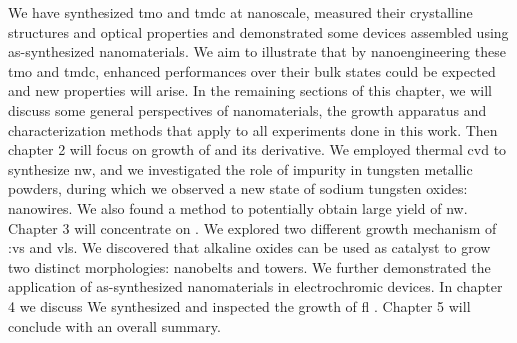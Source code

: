 We have synthesized \gls{tmo} and \gls{tmdc} at nanoscale, measured their crystalline structures and optical properties and demonstrated some devices assembled using as-synthesized nanomaterials. We aim to illustrate that by nanoengineering these \gls{tmo} and \gls{tmdc}, enhanced performances over their bulk states could be expected and new properties will arise. In the remaining sections of this chapter, we will discuss some general perspectives of nanomaterials, the growth apparatus and characterization methods that apply to all experiments done in this work. Then chapter 2 will focus on growth of  and its derivative. We employed thermal \gls{cvd} to synthesize  \gls{nw}, and we investigated the role of impurity in tungsten metallic powders, during which we observed a new state of sodium tungsten oxides:  nanowires. We also found a method to potentially obtain large yield of  \gls{nw}. Chapter 3 will concentrate on . We explored two different growth mechanism of :\gls{vs} and \gls{vls}. We discovered that alkaline oxides can be used as catalyst to grow two distinct  morphologies: nanobelts and towers. We further demonstrated the application of as-synthesized  nanomaterials in electrochromic devices.  In chapter 4 we discuss  We synthesized  and inspected the growth of \gls{fl} . Chapter 5 will conclude with an overall summary.






